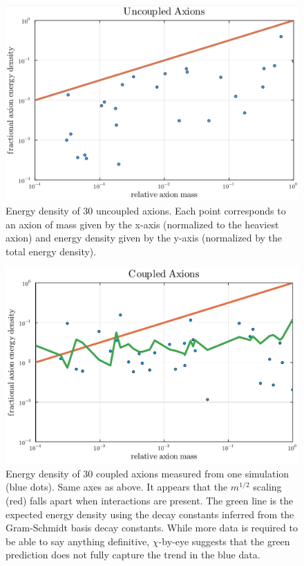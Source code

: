 \documentclass[11pt]{article}
\begin{document}
\begin{figure}[h]
    \centering
    \includegraphics[width=0.9\linewidth]{figs/Uncoupled_Axions.png}
    \caption{Energy density of 30 uncoupled axions. Each point corresponds to an axion of mass given by the x-axis (normalized to the heaviest axion) and energy density given by the y-axis (normalized by the total energy density).}
    \label{fig:e-density-uncoupled}
\end{figure}
\begin{figure}[h]
    \centering
    \includegraphics[width=0.9\linewidth]{figs/Coupled_Axions_With_GS.pdf}
    \caption{Energy density of 30 coupled axions measured from one simulation (blue dots). Same axes as above. It appears that the $m^{1/2}$ scaling (red) falls apart when interactions are present. The green line is the expected energy density using the decay constants inferred from the Gram-Schmidt basis decay constants. While more data is required to be able to say anything definitive, $\chi$-by-eye suggests that the green prediction does not fully capture the trend in the blue data.}
    \label{fig:e-density-coupled}
\end{figure}
\end{document}
